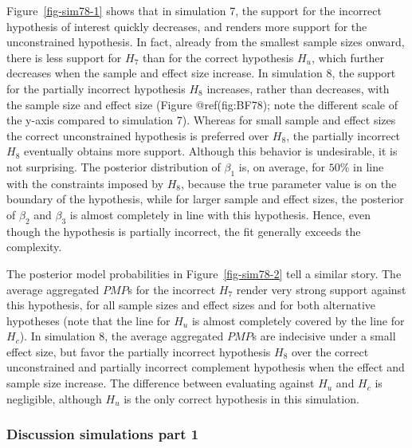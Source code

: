 \documentclass[
  authoryear,
  preprint,
  5p,
  twocolumn]{elsarticle}
\begin{document}
Figure~\ref{fig-sim78-1} shows that in simulation 7, the support for the
incorrect hypothesis of interest quickly decreases, and renders more
support for the unconstrained hypothesis. In fact, already from the
smallest sample sizes onward, there is less support for \(H_7\) than for
the correct hypothesis \(H_u\), which further decreases when the sample
and effect size increase. In simulation 8, the support for the partially
incorrect hypothesis \(H_8\) increases, rather than decreases, with the
sample size and effect size (Figure @ref(fig:BF78); note the different
scale of the y-axis compared to simulation 7). Whereas for small sample
and effect sizes the correct unconstrained hypothesis is preferred over
\(H_8\), the partially incorrect \(H_8\) eventually obtains more
support. Although this behavior is undesirable, it is not surprising.
The posterior distribution of \(\beta_1\) is, on average, for \(50\%\)
in line with the constraints imposed by \(H_8\), because the true
parameter value is on the boundary of the hypothesis, while for larger
sample and effect sizes, the posterior of \(\beta_2\) and \(\beta_3\) is
almost completely in line with this hypothesis. Hence, even though the
hypothesis is partially incorrect, the fit generally exceeds the
complexity.

The posterior model probabilities in Figure~\ref{fig-sim78-2} tell a
similar story. The average aggregated \(PMP\)s for the incorrect \(H_7\)
render very strong support against this hypothesis, for all sample sizes
and effect sizes and for both alternative hypotheses (note that the line
for \(H_u\) is almost completely covered by the line for \(H_c\)). In
simulation 8, the average aggregated \(PMP\)s are indecisive under a
small effect size, but favor the partially incorrect hypothesis \(H_8\)
over the correct unconstrained and partially incorrect complement
hypothesis when the effect and sample size increase. The difference
between evaluating against \(H_u\) and \(H_c\) is negligible, although
\(H_u\) is the only correct hypothesis in this simulation.

\hypertarget{discussion-simulations-part-1}{%
\subsubsection{Discussion simulations part
1}\label{discussion-simulations-part-1}}
\end{document}
